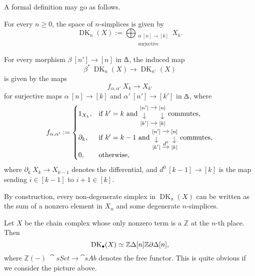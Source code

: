 \begin{construction}
    A formal definition may go as follows. 
    \begin{itms}
        \item For every $n\geq0$, the space of $n$-simplices is given by
        \[\operatorname{DK}_n(X):=\bigoplus_{\substack{\alpha\:[n]\to[k]\\\text{surjective}}}X_k.\]
        \item For every morphism $\beta\:[n']\to[n]$ in $\bfDelta$,
        the induced map
        \[\beta^*\:\operatorname{DK}_{n}(X)\to\operatorname{DK}_{n'}(X)\]
        is given by the maps 
        \[f_{\alpha,\alpha'}\:X_k\to X_{k'}\]
        for surjective maps $\alpha\:[n]\to[k]$ and $\alpha'\:[n']\to[k']$ in $\bfDelta$,
        where 
        \[f_{\alpha,\alpha'}:=\begin{cases}
            1_{X_k}, & \text{if }k'=k\text{ and }
            \begin{tikzcd}[cramped, sep=.9em]
                \scriptstyle[n']\ar[r]\ar[d] & \scriptstyle[n]\ar[d] \\{}
                \scriptstyle[k']\ar[r] & \scriptstyle[k]
            \end{tikzcd}\text{ commutes},\\[15pt]
            \partial_k, & \text{if }k'=k-1\text{ and }
            \begin{tikzcd}[cramped, sep=.9em]
                \scriptstyle[n']\ar[r]\ar[d] & \scriptstyle[n]\ar[d] \\{}
                \scriptstyle[k']\ar[r,"d^0"] & \scriptstyle[k]
            \end{tikzcd}\text{ commutes},\\
            0, & \text{otherwise},
        \end{cases}\]
        where $\partial_k\:X_k\to X_{k-1}$ denotes the differential,
        and $d^0\:[k-1]\to[k]$ is the map sending $i\in[k-1]$ to $i+1\in[k]$. \varqed
    \end{itms}
\end{construction}

By construction, every non-degenerate simplex in $\operatorname{DK}_n(X)$
can be written as the sum of a nonzero element in $X_n$
and some degenerate $n$-simplices.

\begin{example}
    Let $X$ be the chain complex whose only nonzero term
    is a $\mathbb{Z}$ at the $n$-th place. Then 
    \[\operatorname{DK}_\bullet(X)\simeq
    \mathbb{Z}\Delta[n]\/\mathbb{Z}\partial\Delta[n],\]
    where $\mathbb{Z}(-)\:\cat{sSet}\to\cat{sAb}$
    denotes the free functor.
    This is quite obvious if we consider the picture above. \varqed
\end{example}

